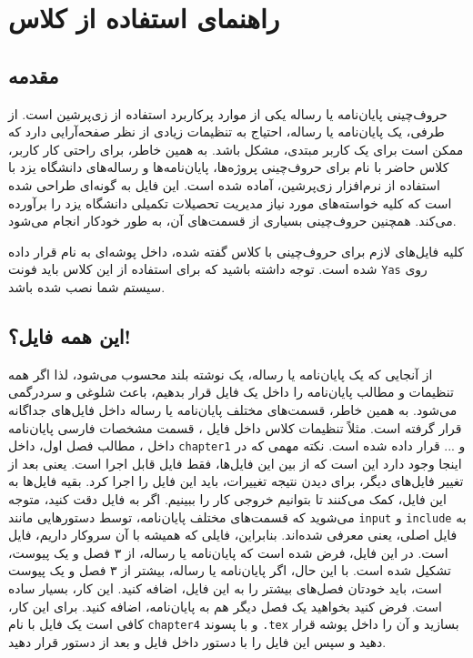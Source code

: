 \chapter{راهنمای استفاده از کلاس }
\section{مقدمه}
حروف‌چینی پایان‌نامه یا رساله یکی از موارد پرکاربرد استفاده از زی‌پرشین است. از طرفی، یک  پایان‌نامه یا رساله،  احتیاج به تنظیمات زیادی از نظر صفحه‌آرایی  دارد که ممکن است برای
یک کاربر مبتدی، مشکل باشد. به همین خاطر، برای راحتی کار کاربر، کلاس حاضر با نام 
 برای حروف‌چینی پروژه‌ها، پایان‌نامه‌ها و رساله‌های دانشگاه یزد با استفاده از نرم‌افزار زی‌پرشین،  آماده شده است. این فایل به 
گونه‌ای طراحی شده است که کلیه خواسته‌های مورد نیاز  مدیریت تحصیلات تکمیلی دانشگاه یزد را برآورده می‌کند. همچنین حروف‌چینی بسیاری
از قسمت‌های آن، به طور خودکار انجام می‌شود.

کلیه فایل‌های لازم برای حروف‌چینی با کلاس گفته شده، داخل پوشه‌ای به نام
  قرار داده شده است. توجه داشته باشید که برای استفاده از این کلاس باید فونت
 \verb!Yas!
    روی سیستم شما نصب شده باشد.
\section{این همه فایل؟!}\label{sec2}
از آنجایی که یک پایان‌نامه یا رساله، یک نوشته بلند محسوب می‌شود، لذا اگر همه تنظیمات و مطالب پایان‌نامه را داخل یک فایل قرار بدهیم، باعث شلوغی
و سردرگمی می‌شود. به همین خاطر، قسمت‌های مختلف پایان‌نامه یا رساله  داخل فایل‌های جداگانه قرار گرفته است. مثلاً تنظیمات  کلاس داخل فایل
، 
قسمت مشخصات فارسی پایان‌نامه داخل 
،
مطالب فصل اول، داخل 
\verb!chapter1!
و ... قرار داده شده است. نکته مهمی که در اینجا وجود دارد این است که از بین این  فایل‌ها، فقط فایل 
قابل اجرا است. یعنی بعد از تغییر فایل‌های دیگر، برای دیدن نتیجه تغییرات، باید این فایل را اجرا کرد. بقیه فایل‌ها به این فایل، کمک می‌کنند تا بتوانیم خروجی کار را ببینیم. اگر به فایل 
دقت کنید، متوجه می‌شوید که قسمت‌های مختلف پایان‌نامه، توسط دستورهایی مانند 
\verb!input!
و
\verb!include!
به فایل اصلی، یعنی 
معرفی شده‌اند. بنابراین، فایلی که همیشه با آن سروکار داریم، فایل 
است.
در این فایل، فرض شده است که پایان‌نامه یا رساله، از ۳ فصل و یک پیوست، تشکیل شده است. با این حال، اگر
  پایان‌نامه یا رساله، بیشتر از ۳ فصل و یک پیوست است، باید خودتان فصل‌های بیشتر را به این فایل، اضافه کنید. این کار، بسیار ساده است. فرض کنید بخواهید یک فصل دیگر هم به پایان‌نامه، اضافه کنید. برای این کار، کافی است یک فایل با نام 
\verb!chapter4!
و با پسوند 
\verb!.tex!
بسازید و آن را داخل پوشه 
قرار دهید و سپس این فایل را با دستور 
\verb!!
داخل فایل
و بعد از دستور
\verb!!
 قرار دهید.
